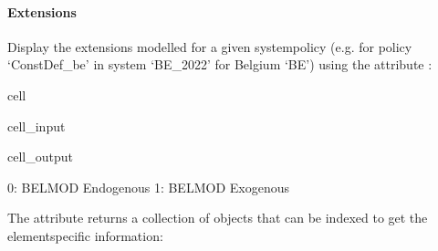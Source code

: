 \documentclass[letterpaper,10pt,english]{sphinxmanual}
\begin{document}
\paragraph{Extensions}
\label{\detokenize{userguide:id4}}
\sphinxAtStartPar
Display the extensions modelled for a given system\sphinxhyphen{}policy (e.g. for policy ‘ConstDef\_be’ in system ‘BE\_2022’ for Belgium ‘BE’) using the attribute :

\begin{sphinxuseclass}{cell}
\begin{sphinxuseclass}{cell_input}
\begin{sphinxVerbatim}[commandchars=\\\{\}]
\PYG{p}{[}\PYG{p}{]}\PYG{p}{[}\PYG{p}{]}\PYG{p}{[}\PYG{p}{]}
\end{sphinxVerbatim}

\end{sphinxuseclass}
\begin{sphinxuseclass}{cell_output}
\begin{sphinxVerbatim}[commandchars=\\\{\}]
0: BELMOD \PYGZhy{} Endogenous
1: BELMOD \PYGZhy{} Exogenous 
\end{sphinxVerbatim}

\end{sphinxuseclass}
\end{sphinxuseclass}
\sphinxAtStartPar
The attribute returns a collection of  objects that can be indexed to get the element\sphinxhyphen{}specific information:
\end{document}

